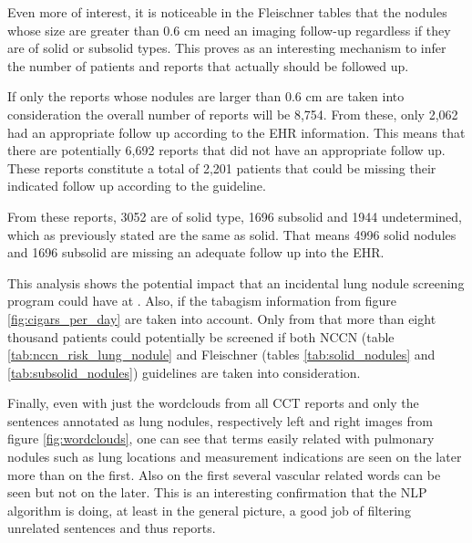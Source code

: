 Even more of interest, it is noticeable in the Fleischner tables that the nodules whose size are greater than 0.6 cm need an imaging follow-up regardless if they are of solid or subsolid types. This proves as an interesting mechanism to infer the number of patients and reports that actually should be followed up. 

If only the reports whose nodules are larger than 0.6 cm are taken into consideration the overall number of reports will be 8,754. From these, only 2,062 had an appropriate follow up according to the EHR information. This means that there are potentially 6,692 reports that did not have an appropriate follow up. These reports constitute a total of 2,201 patients that could be missing their indicated follow up according to the guideline.

From these reports, 3052 are of solid type, 1696 subsolid and 1944 undetermined, which as previously stated are the same as solid. That means 4996 solid nodules and 1696 subsolid are missing an adequate follow up into the \nomeHslShort{} EHR.

This analysis shows the potential impact that an incidental lung nodule screening program could have at \nomeHsl{}. Also, if the tabagism information from figure \ref{fig:cigars_per_day} are taken into account. Only from that more than eight thousand patients could potentially be screened if both NCCN (table \ref{tab:nccn_risk_lung_nodule} and Fleischner (tables \ref{tab:solid_nodules} and \ref{tab:subsolid_nodules}) guidelines are taken into consideration.

Finally, even with just the wordclouds from all CCT reports and only the sentences annotated as lung nodules, respectively left and right images from figure \ref{fig:wordclouds}, one can see that terms easily related with pulmonary nodules such as lung locations and measurement indications are seen on the later more than on the first. Also on the first several vascular related words can be seen but not on the later. This is an interesting confirmation that the NLP algorithm is doing, at least in the general picture, a good job of filtering unrelated sentences and thus reports.
